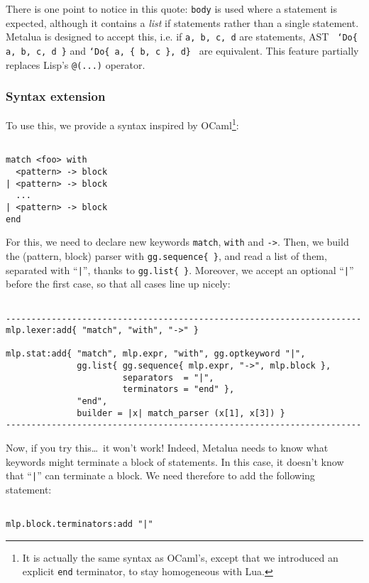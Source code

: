 There is one point to notice in this quote: \verb|body| is used where
a statement is expected, although it contains a {\em list} if
statements rather than a single statement. Metalua is designed to
accept this, i.e. if {\tt a, b, c, d} are statements, AST {\tt
`Do\{  a, b, c, d \}} and {\tt`Do\{ a, \{ b, c \}, d\} } are
equivalent. This feature partially replaces Lisp's \verb|@(...)|
operator.

\subsubsection{Syntax extension}
To use this, we provide a syntax inspired by OCaml\footnote{It is
  actually the same syntax as OCaml's, except that we introduced an
  explicit {\tt end} terminator, to stay homogeneous with Lua.}: 

\begin{Verbatim}[fontsize=\scriptsize]

match <foo> with
  <pattern> -> block
| <pattern> -> block
  ...
| <pattern> -> block
end
\end{Verbatim}

For this, we need to declare new keywords \verb|match|,
\verb|with| and \verb|->|. Then, we build the (pattern, block) parser
with \verb|gg.sequence{ }|, and read a list of them, separated with
``\verb+|+'', thanks to \verb|gg.list{ }|. Moreover, we accept an
optional ``\verb+|+'' before the first case, so that all cases line up
nicely:

\begin{Verbatim}[fontsize=\scriptsize]

----------------------------------------------------------------------
mlp.lexer:add{ "match", "with", "->" }

mlp.stat:add{ "match", mlp.expr, "with", gg.optkeyword "|",
              gg.list{ gg.sequence{ mlp.expr, "->", mlp.block },
                       separators  = "|",
                       terminators = "end" },
              "end",
              builder = |x| match_parser (x[1], x[3]) }
----------------------------------------------------------------------
\end{Verbatim}

\noindent Now, if you try this\ldots\ it won't work! Indeed, Metalua
needs to know what keywords might terminate a block of statements. In
this case, it doesn't know that ``\verb+|+'' can terminate a block. We
need therefore to add the following statement:

\begin{Verbatim}[fontsize=\scriptsize]

mlp.block.terminators:add "|"
\end{Verbatim}

